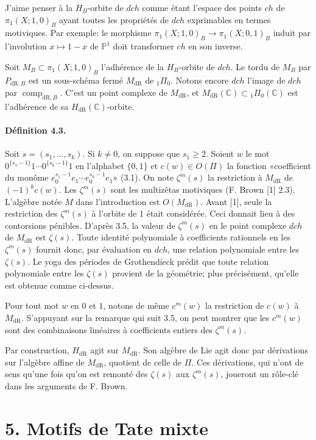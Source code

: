 \documentclass[10pt]{article}
\newcommand{\C}{\mathbb C}
\newcommand{\PP}{\mathbb P}
\newcommand{\comp}{\operatorname{comp}}
\newcommand{\dR}{\mathrm{dR}}
\begin{document}
J'aime penser à la $H_B$-orbite de $dch$ comme étant l'espace des points $ch$ de $\pi_1(X;1,0)_B$ ayant toutes les propriétés de $dch$ exprimables en termes motiviques. Par exemple: le morphisme $\pi_1(X;1,0)_B\to\pi_1(X;0,1)_B$ induit par l'involution $x\mapsto1-x$ de $\PP^1$ doit transformer $ch$ en son inverse.

Soit $M_B\subset\pi_1(X;1,0)_B$ l'adhérence de la $H_B$-orbite de $dch$. Le tordu de $M_B$ par $P_{\dR,B}$ est un sous-schéma fermé $M_{\dR}$ de ${}_1\Pi_0$. Notons encore $dch$ l'image de $dch$ par $\comp_{\dR,B}$. C'est un point complexe de $M_{\dR}$, et $M_{\dR}(\C)\subset {}_1\Pi_0(\C)$ est l'adhérence de sa $H_{\dR}(\C)$-orbite.

\paragraph{Définition 4.3.}
Soit $s=(s_1,\ldots,s_k)$. Si $k\ne0$, on suppose que $s_1\geq2$. Soient $w$ le mot $0^{\{s_1-1\}}1\cdots0^{\{s_k-1\}}1$ en l'alphabet $\{0,1\}$ et $c(w)\in O(\Pi)$ la fonction «coefficient du monôme $e_0^{s_1-1}e_1\cdots e_0^{s_k-1}e_1$» (3.1). On note $\zeta^m(s)$ la restriction à $M_{\dR}$ de $(-1)^kc(w)$. Les $\zeta^m(s)$ sont les multizêtas motiviques (F. Brown [1] 2.3). L'algèbre notée $M$ dans l'introduction est $O(M_{\dR})$. Avant [1], seule la restriction des $\zeta^m(s)$ à l'orbite de $1$ était considérée. Ceci donnait lieu à des contorsions pénibles. D'après 3.5, la valeur de $\zeta^m(s)$ en le point complexe $dch$ de $M_{\dR}$ est $\zeta(s)$. Toute identité polynomiale à coefficients rationnels en les $\zeta^m(s)$ fournit donc, par évaluation en $dch$, une relation polynomiale entre les $\zeta(s)$. Le yoga des périodes de Grothendieck prédit que toute relation polynomiale entre les $\zeta(s)$ provient de la géométrie; plus précisément, qu'elle est obtenue comme ci-dessus.

Pour tout mot $w$ en $0$ et $1$, notons de même $c^m(w)$ la restriction de $c(w)$ à $M_{\dR}$. S'appuyant sur la remarque qui suit 3.5, on peut montrer que les $c^m(w)$ sont des combinaisons linéaires à coefficients entiers des $\zeta^m(s)$.

Par construction, $H_{\dR}$ agit sur $M_{\dR}$. Son algèbre de Lie agit donc par dérivations sur l'algèbre affine de $M_{\dR}$, quotient de celle de $\Pi$. Ces dérivations, qui n'ont de sens qu'une fois qu'on est remonté des $\zeta(s)$ aux $\zeta^m(s)$, joueront un rôle-clé dans les arguments de F. Brown.

\section*{5. Motifs de Tate mixte}
\end{document}

